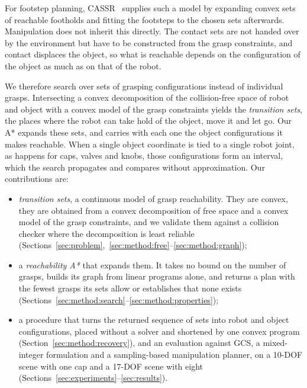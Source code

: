 For footstep planning, CASSR~\cite{wang2026cassr} supplies such a model by
expanding convex sets of reachable footholds and fitting the footsteps to the
chosen sets afterwards. Manipulation does not inherit this directly. The
contact sets are not handed over by the environment but have to be constructed
from the grasp constraints, and contact displaces the object, so what is
reachable depends on the configuration of the object as much as on that of the
robot.

We therefore search over sets of grasping configurations instead of individual
grasps. Intersecting a convex decomposition of the collision-free space of
robot and object with a convex model of the grasp constraints yields the
\emph{transition sets}, the places where the robot can take hold of the
object, move it and let go. Our A* expands these sets, and carries with each
one the object configurations it makes reachable. When a single object
coordinate is tied to a single robot joint, as happens for caps, valves and
knobs, those configurations form an interval, which the search propagates and
compares without approximation. Our contributions are:
\begin{itemize}
  \item \emph{transition sets}, a continuous model of grasp reachability.
    They are convex, they are obtained from a convex decomposition of free
    space and a convex model of the grasp constraints, and we validate them
    against a collision checker where the decomposition is least reliable
    (Sections~\ref{sec:problem},~\ref{sec:method:free}--\ref{sec:method:graph});
  \item a \emph{reachability A*} that expands them. It takes no bound on the
    number of grasps, builds its graph from linear programs alone, and returns
    a plan with the fewest grasps its sets allow or establishes that none
    exists (Sections~\ref{sec:method:search}--\ref{sec:method:properties});
  \item a procedure that turns the returned sequence of sets into robot and
    object configurations, placed without a solver and shortened by one convex
    program (Section~\ref{sec:method:recovery}), and an evaluation against
    GCS, a mixed-integer formulation and a sampling-based manipulation planner,
    on a 10-DOF scene with one cap and a 17-DOF scene with eight
    (Sections~\ref{sec:experiments}--\ref{sec:results}).
\end{itemize}

